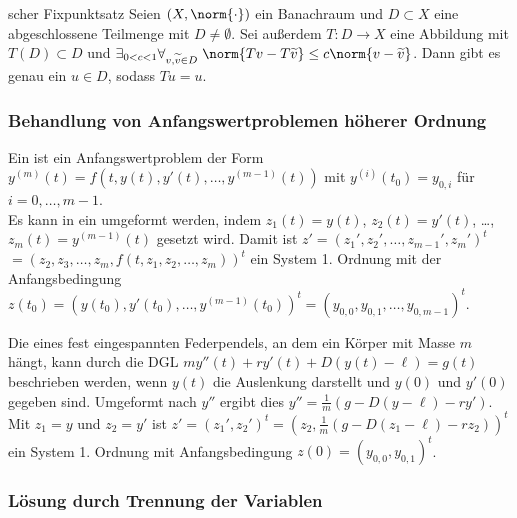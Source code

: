 \begin{Satz}{scher Fixpunktsatz}
    Seien $(X, \norm{\cdot})$ ein Banachraum und
    $D \subset X$ eine abgeschlossene Teilmenge mit $D \not= \emptyset$.
    Sei außerdem $T\colon D \rightarrow X$ eine Abbildung mit
    $T(D) \subset D$ und
    $\exists_{0 < c < 1} \forall_{v, \widetilde{v} \in D}\;
    \norm{Tv - T\widetilde{v}} \le c \norm{v - \widetilde{v}}$.
    Dann gibt es genau ein $u \in D$, sodass $Tu = u$.
\end{Satz}

\subsubsection{%
    Behandlung von Anfangswertproblemen höherer Ordnung%
}

\begin{Bem}
    Ein  ist ein Anfangswertproblem
    der Form $y^{(m)}(t) = f(t, y(t), y'(t), \dotsc, y^{(m-1)}(t))$ mit
    $y^{(i)}(t_0) = y_{0,i}$ für $i = 0, \dotsc, m - 1$.\\
    Es kann in ein  umgeformt werden, indem
    $z_1(t) = y(t)$, $z_2(t) = y'(t)$, \dots, $z_m(t) = y^{(m-1)}(t)$ gesetzt
    wird.
    Damit ist $z' = (z_1', z_2', \dotsc, z_{m-1}', z_m')^t$\\
    $= (z_2, z_3, \dotsc, z_m, f(t, z_1, z_2, \dotsc, z_m))^t$
    ein System 1. Ordnung mit der Anfangsbedingung\\
    $z(t_0) = (y(t_0), y'(t_0), \dotsc, y^{(m-1)}(t_0))^t =
    (y_{0,0}, y_{0,1}, \dotsc, y_{0,m-1})^t$.
\end{Bem}

\begin{Bsp}
    Die  eines fest eingespannten
    Federpendels, an dem ein Körper mit Masse $m$ hängt, kann durch die DGL
    $m y''(t) + r y'(t) + D(y(t) - \ell) = g(t)$ beschrieben werden,
    wenn $y(t)$ die Auslenkung darstellt und $y(0)$ und $y'(0)$ gegeben sind.
    Umgeformt nach $y''$ ergibt dies
    $y'' = \frac{1}{m} (g - D(y - \ell) - ry')$.
    Mit $z_1 = y$ und $z_2 = y'$ ist
    $z' = (z_1', z_2')^t = (z_2, \frac{1}{m} (g - D(z_1 - \ell) - r z_2))^t$
    ein System 1. Ordnung mit Anfangsbedingung
    $z(0) = (y_{0,0}, y_{0,1})^t$.
\end{Bsp}

\subsubsection{%
    Lösung durch Trennung der Variablen%
}

